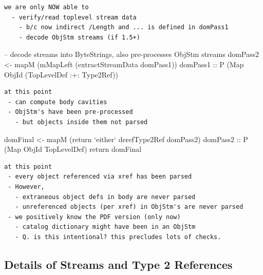 

\begin{lstlisting}[style=meta]
we are only NOW able to
  - verify/read toplevel stream data
    - b/c now indirect /Length and ... is defined in domPass1
    - decode ObjStm streams (if 1.5+)
\end{lstlisting}

\begin{code}
    -- decode streams into ByteStrings, also pre-processes ObjStm streams
    domPass2 <- mapM
                  (mMapLeft (extractStreamData domPass1))
                  domPass1
                :: P (Map ObjId (TopLevelDef :+: Type2Ref))
\end{code}

\begin{lstlisting}[style=meta]
at this point
 - can compute body cavities
 - ObjStm's have been pre-processed
   - but objects inside them not parsed
\end{lstlisting}

\begin{code}
    domFinal <- mapM
                 (return `either` derefType2Ref domPass2)
                  domPass2
                :: P (Map ObjId TopLevelDef)
    return domFinal
\end{code}

\begin{lstlisting}[style=meta]
at this point
 - every object referenced via xref has been parsed
 - However,
   - extraneous object defs in body are never parsed
   - unreferenced objects (per xref) in ObjStm's are never parsed
 - we positively know the PDF version (only now)
   - catalog dictionary might have been in an ObjStm
   - Q. is this intentional? this precludes lots of checks.
\end{lstlisting}

\subsection{Details of Streams and Type 2 References}



